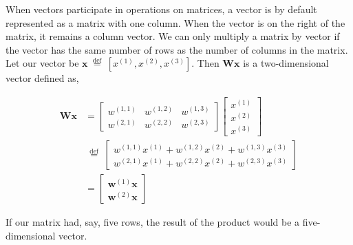 \documentclass[9pt,dvipsnames]{beamer}
\begin{document}
\begin{frame}
	When vectors participate in operations on matrices, a vector is by default represented as a matrix with one column. When the vector is on the right of the matrix, it remains a column vector. We can only multiply a matrix by vector if the vector has the same number of rows as the number of columns in the matrix. Let our vector be $\mathbf{x} \stackrel{\text { def }}{=}\left[x^{(1)}, x^{(2)}, x^{(3)}\right]$. Then $\mathbf{W} \mathbf{x}$ is a two-dimensional vector defined as,
	
	$$
	\begin{aligned}
		\mathbf{W} \mathbf{x} & =\left[\begin{array}{lll}
			w^{(1,1)} & w^{(1,2)} & w^{(1,3)} \\
			w^{(2,1)} & w^{(2,2)} & w^{(2,3)}
		\end{array}\right]\left[\begin{array}{l}
			x^{(1)} \\
			x^{(2)} \\
			x^{(3)}
		\end{array}\right] \\
		& \stackrel{\text { def }}{=}\left[\begin{array}{l}
			w^{(1,1)} x^{(1)}+w^{(1,2)} x^{(2)}+w^{(1,3)} x^{(3)} \\
			w^{(2,1)} x^{(1)}+w^{(2,2)} x^{(2)}+w^{(2,3)} x^{(3)}
		\end{array}\right] \\
		& =\left[\begin{array}{l}
			\mathbf{w}^{(1)} \mathbf{x} \\
			\mathbf{w}^{(2)} \mathbf{x}
		\end{array}\right]
	\end{aligned}
	$$
	
	If our matrix had, say, five rows, the result of the product would be a five-dimensional vector.
\end{frame}
\end{document}
